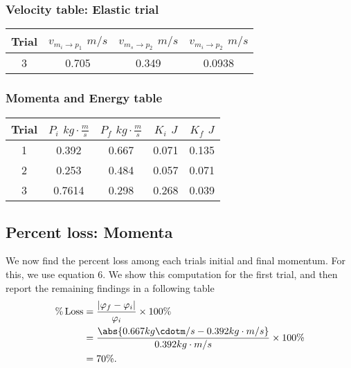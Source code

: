 \documentclass{report}
\begin{document}
    \subsubsection{Velocity table: Elastic trial}
    \begin{center}
        \begin{tabular}{c|c|c|c}
            Trial & $v_{m_{i} \rightarrow p_{1}}$ $m/s$ & $v_{m_{s} \rightarrow p_{2}}$ $m/s$ & $v_{m_{i} \rightarrow p_{2}}$ $m/s$ \\
            \hline
            3 & 0.705 & 0.349 & 0.0938
        \end{tabular}
    \end{center}

    \bigbreak \noindent 
    \subsubsection{Momenta and Energy table}
    \begin{center}
        \begin{tabular}{c|c|c|c|c}
            Trial & $P_{i}$ $kg \cdot \frac{m}{s} $ & $P_{f}$ $kg \cdot \frac{m}{s} $ & $K_{i}$ $J$ & $K_{f}$ $J$ \\
            \hline
            1 & 0.392 & 0.667 & 0.071 & 0.135 \\ 
            2  & 0.253 & 0.484 & 0.057 & 0.071\\ 
            3  & 0.7614 & 0.298 & 0.268 & 0.039
        \end{tabular}
    \end{center}

    \bigbreak \noindent 
    \subsection{Percent loss: Momenta}
    \bigbreak \noindent 
    We now find the percent loss among each trials initial and final momentum. For this, we use equation 6. We show this computation for the first trial, and then report the remaining findings in a following table
    \begin{align*}
        \% \operatorname{Loss}&=\frac{\left|\varphi_f-\varphi_i\right|}{\varphi_i} \times 100 \% \\
                              &= \frac{\abs{0.667 kg \cdotm/s - 0.392 kg \cdot m/s}}{0.392 kg \cdot m/s} \times 100\% \\
                              &=70\%
    .\end{align*}
\end{document}
